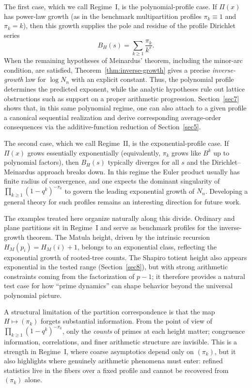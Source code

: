 \documentclass[11pt]{article}
\theoremstyle{definition}
\begin{document}
The first case, which we call Regime~I, is the polynomial-profile case.  If $\Pi(x)$ has power-law growth (as in the benchmark multipartition profiles
$\pi_k\equiv1$ and $\pi_k=k$), then this growth supplies the pole and residue of
the profile Dirichlet series
\[
  B_H(s)=\sum_{k\ge1}\frac{\pi_k}{k^s}.
\]
When the remaining hypotheses of Meinardus' theorem, including the minor-arc
condition, are satisfied, Theorem~\ref{thm:inverse-growth} gives a precise
\emph{inverse-growth} law for $\log N_n$ with an explicit constant.  Thus, the
polynomial profile determines the predicted exponent, while the analytic
hypotheses rule out lattice obstructions such as support on a proper arithmetic
progression.  Section~\ref{sec7} shows that, in this same polynomial regime, one
can also attach to a given profile a canonical sequential realization and derive
corresponding average-order consequences via the additive-function reduction of
Section~\ref{sec5}.

The second case, which we call Regime~II, is the exponential-profile case.  If $\Pi(x)$ grows essentially exponentially (equivalently, $\pi_k$ grows like
$B^k$ up to polynomial factors), then $B_H(s)$ typically diverges for all $s$
and the Dirichlet--Meinardus approach breaks down.  In this regime the Euler
product usually has finite radius of convergence, and one expects the dominant
singularity of $\prod_{k\ge1}(1-q^k)^{-\pi_k}$ to govern the leading exponential
growth of $N_n$.  Developing a general theory for such profiles remains an
interesting direction for future work.


The examples treated here organize naturally along this divide.  Ordinary and
plane partitions sit in Regime~I and serve as benchmark profiles for the
inverse-growth theorem.  The Matula height, driven by the intrinsic recursion
$H_M(p_i)=H_M(i)+1$, belongs to an exponential class, reflecting the exponential
growth of rooted-tree counts.  The Shapiro totient height also appears
exponential in the tested range (Section~\ref{sec8}), but with strong arithmetic
constraints coming from the factorization of $p-1$; it therefore provides a
natural test case for how ``prime dynamics'' can shape behavior beyond the
universal polynomial picture.


A structural limitation of the partition correspondence is that the map
$H\mapsto(\pi_k)$ forgets substantial information.  From the point of view of
$\prod_{k\ge1}(1-q^k)^{-\pi_k}$, only the \emph{counts} of primes at each height
matter; congruence information, correlations, and finer arithmetic structure are
invisible.  This is a strength in Regime~I, where coarse asymptotics depend only
on $(\pi_k)$, but it also highlights where genuinely arithmetic phenomena must
enter: refined statistics live in the fibers over a fixed profile and cannot be
recovered from $(\pi_k)$ alone.
\end{document}
